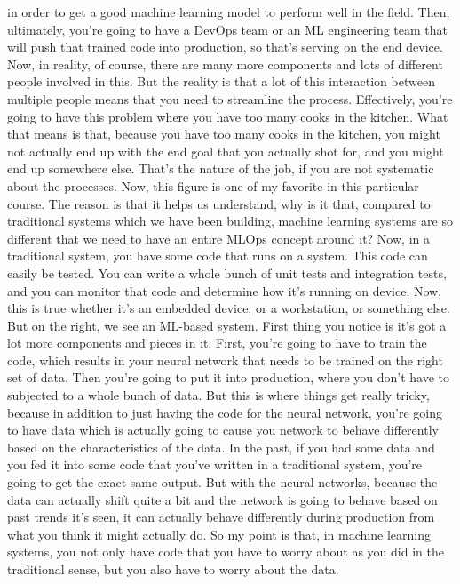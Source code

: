 in order to get a good machine learning model to perform well in the field.
Then, ultimately, you're going to have a DevOps team or an ML engineering
team that will push that trained code into production,
so that's serving on the end device.
Now, in reality, of course, there are many more components and lots
of different people involved in this.
But the reality is that a lot of this interaction between multiple people
means that you need to streamline the process.
Effectively, you're going to have this problem where
you have too many cooks in the kitchen.
What that means is that, because you have too many cooks in the kitchen,
you might not actually end up with the end goal that you actually shot for,
and you might end up somewhere else.
That's the nature of the job, if you are not systematic about the processes.
Now, this figure is one of my favorite in this particular course.
The reason is that it helps us understand,
why is it that, compared to traditional systems which we have been building,
machine learning systems are so different that we need to have
an entire MLOps concept around it?
Now, in a traditional system, you have some code that runs on a system.
This code can easily be tested.
You can write a whole bunch of unit tests and integration tests,
and you can monitor that code and determine how it's running on device.
Now, this is true whether it's an embedded device, or a workstation,
or something else.
But on the right, we see an ML-based system.
First thing you notice is it's got a lot more components and pieces in it.
First, you're going to have to train the code, which
results in your neural network that needs
to be trained on the right set of data.
Then you're going to put it into production, where you don't have
to subjected to a whole bunch of data.
But this is where things get really tricky,
because in addition to just having the code for the neural network,
you're going to have data which is actually
going to cause you network to behave differently based
on the characteristics of the data.
In the past, if you had some data and you fed it into some code
that you've written in a traditional system,
you're going to get the exact same output.
But with the neural networks, because the data can actually shift quite a bit
and the network is going to behave based on past trends it's seen,
it can actually behave differently during production from what
you think it might actually do.
So my point is that, in machine learning systems,
you not only have code that you have to worry about
as you did in the traditional sense, but you also have to worry about the data.

